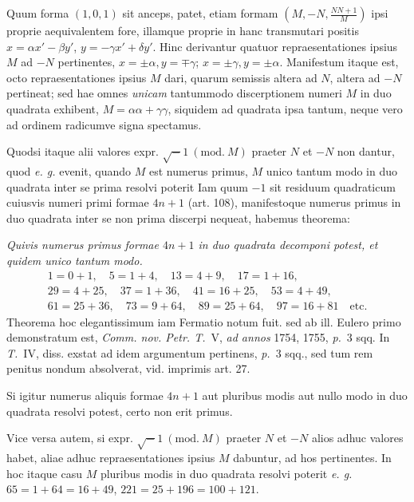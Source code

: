 Quum forma $(1,0,1)$ sit anceps, patet, etiam formam $(M,-N,\frac{NN+1}{M})$ ipsi proprie aequivalentem fore, illamque proprie in hanc transmutari positis $x=\alpha x'-\beta y'$, $y=-\gamma x'+\delta y'$. Hinc derivantur quatuor repraesentationes ipsius $M$ ad $-N$ pertinentes, $x=\pm\alpha,y=\mp\gamma$; $x=\pm\gamma,y=\pm\alpha$. Manifestum itaque est, octo repraesentationes ipsius $M$ dari, quarum semissis altera ad $N$, altera ad $-N$ pertineat; sed hae omnes \textit{unicam} tantummodo discerptionem numeri $M$ in duo quadrata exhibent, $M=\alpha\alpha+\gamma\gamma$, siquidem ad quadrata ipsa tantum, neque vero ad ordinem radicumve signa spectamus.

Quodsi itaque alii valores expr. $\surd-1\ (\mathrm{mod.}\ M)$ praeter $N$ et $-N$ non dantur, quod \textit{e. g.} evenit, quando $M$ est numerus primus, $M$ unico tantum modo in duo quadrata inter se prima resolvi poterit Iam quum $-1$ sit residuum quadraticum cuiusvis numeri primi formae $4n+1$ (art. 108), manifestoque numerus primus in duo quadrata inter se non prima discerpi nequeat, habemus theorema:

\textit{Quivis numerus primus formae $4n+1$ in duo quadrata decomponi potest, et quidem unico tantum modo.}
\[
\begin{gathered}
1=0+1,\quad5=1+4,\quad13=4+9,\quad17=1+16,\\
29=4+25,\quad37=1+36,\quad41=16+25,\quad53=4+49,\\
61=25+36,\quad73=9+64,\quad89=25+64,\quad97=16+81\quad\text{etc.}
\end{gathered}
\]
Theorema hoc elegantissimum iam Fermatio notum fuit. sed ab ill. Eulero primo demonstratum est, \textit{Comm. nov. Petr. T.}\ V, \textit{ad annos} 1754, 1755, \textit{p.}\ 3 sqq. In \textit{T.}\ IV, diss. exstat ad idem argumentum pertinens, \textit{p.}\ 3 sqq., sed tum rem penitus nondum absolverat, vid. imprimis art. 27.

Si igitur numerus aliquis formae $4n+1$ aut pluribus modis aut nullo modo in duo quadrata resolvi potest, certo non erit primus.

Vice versa autem, si expr. $\surd-1\ (\mathrm{mod.}\ M)$ praeter $N$ et $-N$ alios adhuc valores habet, aliae adhuc repraesentationes ipsius $M$ dabuntur, ad hos pertinentes. In hoc itaque casu $M$ pluribus modis in duo quadrata resolvi poterit \textit{e. g.} $65=1+64=16+49$, $221=25+196=100+121$.

